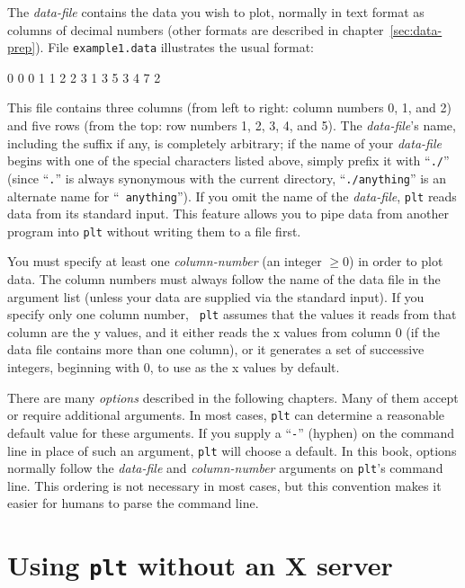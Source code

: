 \documentclass{book}
\begin{document}
The {\em data-file} contains the data you wish to plot, normally in
text format as columns of decimal numbers (other formats are described
in chapter~\ref{sec:data-prep}).  File {\tt example1.data} illustrates
the usual format:

\begin{center}
\begin{boxedverbatim}
0 0 0
1 1 2
2 3 1
3 5 3
4 7 2
\end{boxedverbatim}
\end{center}

\noindent
{}%
This file contains three columns (from left to right: column numbers
0, 1, and 2) and five rows (from the top: row numbers 1, 2, 3, 4, and
5).  The {\em data-file}'s name, including the suffix if any, is
completely arbitrary; if the name of your {\em data-file} begins with
one of the special characters listed above, simply prefix it with
``{\tt ./}'' (since ``{\tt .}'' is always synonymous with the current
directory, ``{\tt ./anything}'' is an alternate name for ``{\tt
anything}'').  If you omit the name of the {\em data-file}, {\tt plt}
reads data from its standard input.  This feature allows you to pipe
data from another program into {\tt plt} without writing them to a
file first.

%
You must specify at least one {\em column-number} (an integer $\ge 0$)
in order to plot data.  The column numbers must always follow the name
of the data file in the argument list (unless your data are supplied
via the standard input).  If you specify only one column number, {\tt
plt} assumes that the values it reads from that column are the y
values, and it either reads the x values from column 0 (if the data
file contains more than one column), or it generates a set of
successive integers, beginning with 0, to use as the x values by
default.

There are many {\em options} described in the following chapters.
Many of them accept or require additional arguments.  In most cases,
{\tt plt} can determine a reasonable default value for these
arguments.  If you supply a ``{\tt -}'' (hyphen) on the command line
in place of such an argument, {\tt plt} will choose a default.  In
this book, options normally follow the {\em data-file} and {\em
column-number} arguments on {\tt plt}'s command line.  This ordering
is not necessary in most cases, but this convention makes it easier
for humans to parse the command line.

\section{Using {\tt plt} without an X server \label{sec:nox}}
\end{document}
